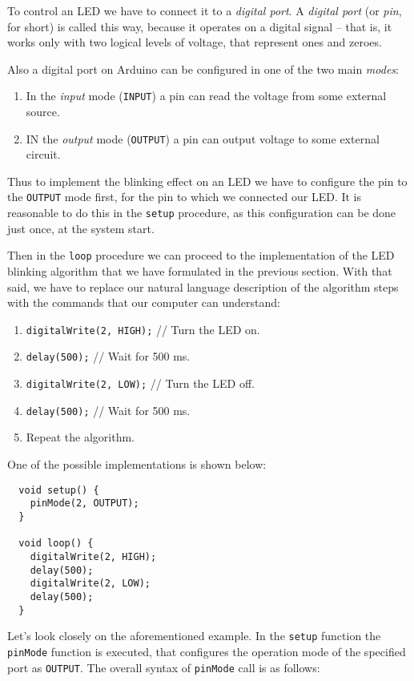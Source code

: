 \documentclass[../sparc.tex]{subfiles}
\begin{document}
To control an LED we have to connect it to a \emph{digital port}.  A
\emph{digital port} (or \emph{pin}, for short) is called this way, because it
operates on a digital signal -- that is, it works only with two logical levels of
voltage, that represent ones and zeroes.

Also a digital port on Arduino can be configured in one of the two main
\emph{modes}:
\begin{enumerate}
\item In the \emph{input} mode (\texttt{INPUT}) a pin can read the voltage from
  some external source.
\item IN the \emph{output} mode (\texttt{OUTPUT}) a pin can output voltage to
  some external circuit.
\end{enumerate}

Thus to implement the blinking effect on an LED we have to configure the pin to
the \texttt{OUTPUT} mode first, for the pin to which we connected our LED.  It
is reasonable to do this in the \texttt{setup} procedure, as this configuration
can be done just once, at the system start.

Then in the \texttt{loop} procedure we can proceed to the implementation of the
LED blinking algorithm that we have formulated in the previous section.  With
that said, we have to replace our natural language description of the algorithm
steps with the commands that our computer can understand:

\begin{enumerate}
\item \texttt{digitalWrite(2, HIGH);} // Turn the LED on.
\item \texttt{delay(500);} // Wait for 500 ms.
\item \texttt{digitalWrite(2, LOW);} // Turn the LED off.
\item \texttt{delay(500);} // Wait for 500 ms.
\item Repeat the algorithm.
\end{enumerate}

One of the possible implementations is shown below:

\begin{verbatim}
  void setup() {
    pinMode(2, OUTPUT);
  }

  void loop() {
    digitalWrite(2, HIGH);
    delay(500);
    digitalWrite(2, LOW);
    delay(500);
  }
\end{verbatim}

Let's look closely on the aforementioned example.  In the \texttt{setup}
function the \texttt{pinMode} function is executed, that configures the
operation mode of the specified port as \texttt{OUTPUT}.  The overall syntax of
\texttt{pinMode} call is as follows:
\end{document}
